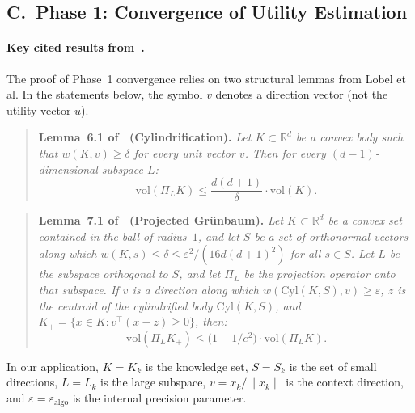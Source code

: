 \documentclass[letterpaper, 10 pt, conference]{IEEEconf}
\begin{document}
\subsection*{C.~Phase 1: Convergence of Utility Estimation}
\label{sec:app_phase1}

\paragraph{Key cited results from~\cite{Lobel2018multidimensional}.} The proof of Phase~1 convergence relies on two structural lemmas from Lobel et al. In the statements below, the symbol $v$ denotes a direction vector (not the utility vector $u$).

\begin{quote}
\textbf{Lemma~6.1 of~\cite{Lobel2018multidimensional} (Cylindrification).}
\textit{Let $K \subset \mathbb{R}^d$ be a convex body such that $w(K, v) \geq \delta$ for every unit vector $v$. Then for every $(d-1)$-dimensional subspace $L$:}
\begin{equation}
    \mathrm{vol}(\Pi_L K) \leq \frac{d(d+1)}{\delta} \cdot \mathrm{vol}(K).
\end{equation}
\end{quote}

\begin{quote}
\textbf{Lemma~7.1 of~\cite{Lobel2018multidimensional} (Projected Gr\"unbaum).}
\textit{Let $K \subset \mathbb{R}^d$ be a convex set contained in the ball of radius~$1$, and let $S$ be a set of orthonormal vectors along which $w(K, s) \leq \delta \leq \varepsilon^2/(16d(d+1)^2)$ for all $s \in S$. Let $L$ be the subspace orthogonal to $S$, and let $\Pi_L$ be the projection operator onto that subspace. If $v$ is a direction along which $w(\mathrm{Cyl}(K, S), v) \geq \varepsilon$, $z$ is the centroid of the cylindrified body $\mathrm{Cyl}(K, S)$, and $K_+ = \{x \in K : v^\top(x - z) \geq 0\}$, then:}
\begin{equation}
    \mathrm{vol}(\Pi_L K_+) \leq \big(1 - 1/e^2\big) \cdot \mathrm{vol}(\Pi_L K).
\end{equation}
\end{quote}

\noindent In our application, $K = K_k$ is the knowledge set, $S = S_k$ is the set of small directions, $L = L_k$ is the large subspace, $v = x_k / \|x_k\|$ is the context direction, and $\varepsilon = \varepsilon_{\mathrm{algo}}$ is the internal precision parameter.
\end{document}
